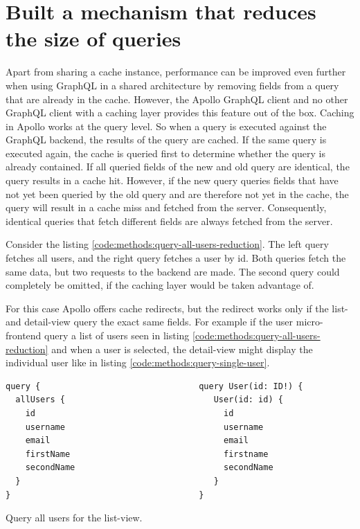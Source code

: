 \section{Built a mechanism that reduces the size of queries}

Apart from sharing a cache instance, performance can be improved even further when using GraphQL in a shared architecture by removing fields from a query that are already in the cache.
However, the Apollo GraphQL client and no other GraphQL client with a caching layer provides this feature out of the box. Caching in Apollo works at the query level. So when a query is executed against the GraphQL backend, the results of the query are cached. If the same query is executed again, the cache is queried first to determine whether the query is already contained. If all queried fields of the new and old query are identical, the query results in a cache hit. However, if the new query queries fields that have not yet been queried by the old query and are therefore not yet in the cache, the query will result in a cache miss and fetched from the server. Consequently, identical queries that fetch different fields are always fetched from the server.

Consider the listing \ref{code:methods:query-all-users-reduction}. The left query fetches all users, and the right query fetches a user by id. Both queries fetch the same data, but two requests to the backend are made. The second query could completely be omitted, if the caching layer would be taken advantage of.

For this case Apollo offers cache redirects, but the redirect works only if the list- and detail-view query the exact same fields. For example if the user micro-frontend query a list of users seen in listing \ref{code:methods:query-all-users-reduction} and when a user is selected, the detail-view might display the individual user like in listing \ref{code:methods:query-single-user}.

\ifshowListings
\begin{listing}[H]
\begin{verbatim}
query {                                query User(id: ID!) {
  allUsers {                              User(id: id) {
    id                                      id
    username                                username
    email                                   email
    firstName                               firstname
    secondName                              secondName
  }                                       }
}                                      }
\end{verbatim}
\caption{Query all users for the list-view.}\label{code:methods:query-all-users-reduction}
\end{listing}
\fi

